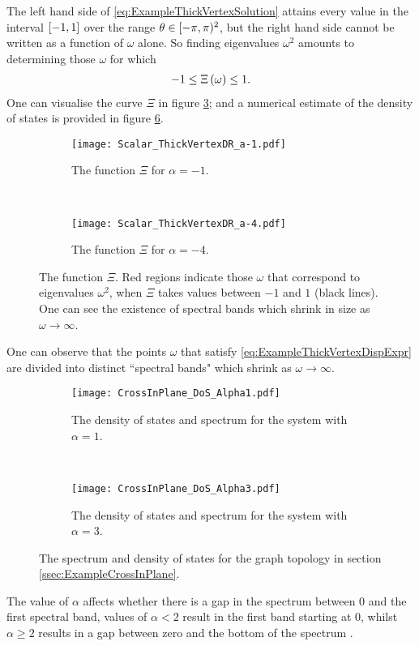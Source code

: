 The left hand side of \eqref{eq:ExampleThickVertexSolution} attains every value in the interval $\left[ -1,1 \right]$ over the range $\theta\in[-\pi,\pi)^2$, but the right hand side cannot be written as a function of $\omega$ alone.
So finding eigenvalues $\omega^2$ amounts to determining those $\omega$ for which
\begin{align} \label{eq:ExampleThickVertexDispExpr}
	-1 \leq \Xi\left( \omega \right) \leq 1.
\end{align}
One can visualise the curve $\Xi$ in figure \ref{fig:Scalar_ThickVertexDR}; and a numerical estimate of the density of states  is provided in figure \ref{fig:CrossInPlane_DoS}.
\begin{figure}[t]
	\centering
	\begin{subfigure}[t]{0.45\textwidth}
		\centering
		\texttt{[image: Scalar\_ThickVertexDR\_a-1.pdf]}
		\caption{\label{fig:Scalar_ThickVertexDR_a-1} The function $\Xi$ for $\alpha=-1$.}
	\end{subfigure}
	~
	\begin{subfigure}[t]{0.45\textwidth}
		\centering
		\texttt{[image: Scalar\_ThickVertexDR\_a-4.pdf]}
		\caption{\label{fig:Scalar_ThickVertexDR_a-4} The function $\Xi$ for $\alpha=-4$.}
	\end{subfigure}
	\caption{\label{fig:Scalar_ThickVertexDR} The function $\Xi$. Red regions indicate those $\omega$ that correspond to eigenvalues $\omega^2$, when $\Xi$ takes values between $-1$ and $1$ (black lines). One can see the existence of spectral bands which shrink in size as $\omega\rightarrow\infty$.}
\end{figure}
One can observe that the points $\omega$ that satisfy \eqref{eq:ExampleThickVertexDispExpr} are divided into distinct ``spectral bands" which shrink as $\omega\rightarrow\infty$.
\begin{figure}[b!]
	\centering
	\begin{subfigure}[t]{0.45\textwidth}
		\centering
		\texttt{[image: CrossInPlane\_DoS\_Alpha1.pdf]}
		\caption{\label{fig:CrossInPlane_DoS_Alpha1} The density of states and spectrum for the system with $\alpha=1$.}
	\end{subfigure}
	~
	\begin{subfigure}[t]{0.45\textwidth}
		\centering
		\texttt{[image: CrossInPlane\_DoS\_Alpha3.pdf]}
		\caption{\label{fig:CrossInPlane_DoS_Alpha3} The density of states and spectrum for the system with $\alpha=3$.}
	\end{subfigure}
	\caption{\label{fig:CrossInPlane_DoS} The spectrum and density of states for the graph topology in section \ref{ssec:ExampleCrossInPlane}.}
\end{figure}
The value of $\alpha$ affects whether there is a gap in the spectrum between 0 and the first spectral band, values of $\alpha<2$ result in the first band starting at 0, whilst $\alpha\geq 2$ results in a gap between zero and the bottom of the spectrum .